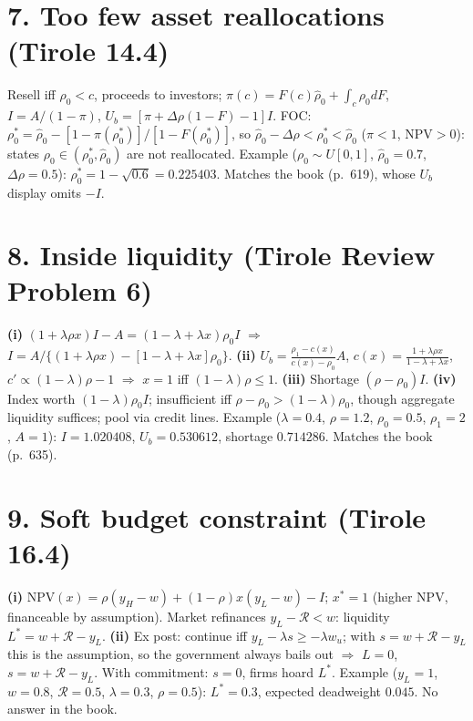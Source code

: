 \documentclass[11pt,a4paper]{article}
\newcommand{\Rc}{\mathcal{R}}
\begin{document}
\section*{7. Too few asset reallocations (Tirole 14.4)}
Resell iff $\rho_0<c$, proceeds to investors; $\pi(c)=F(c)\hat\rho_0+\int_c\rho_0dF$, $I=A/(1-\pi)$, $U_b=[\pi+\Delta\rho(1-F)-1]I$. FOC: $\rho_0^*=\hat\rho_0-[1-\pi(\rho_0^*)]/[1-F(\rho_0^*)]$, so $\hat\rho_0-\Delta\rho<\rho_0^*<\hat\rho_0$ ($\pi<1$, NPV$>0$): states $\rho_0\in(\rho_0^*,\hat\rho_0)$ are not reallocated.
Example ($\rho_0\sim U[0,1]$, $\hat\rho_0=0.7$, $\Delta\rho=0.5$): $\rho_0^*=1-\sqrt{0.6}=0.225403$. Matches the book (p.~619), whose $U_b$ display omits $-I$.

\section*{8. Inside liquidity (Tirole Review Problem 6)}
\textbf{(i)} $(1+\lambda\rho x)I-A=(1-\lambda+\lambda x)\rho_0I$ $\Rightarrow$ $I=A/\{(1+\lambda\rho x)-[1-\lambda+\lambda x]\rho_0\}$.
\textbf{(ii)} $U_b=\frac{\rho_1-c(x)}{c(x)-\rho_0}A$, $c(x)=\frac{1+\lambda\rho x}{1-\lambda+\lambda x}$, $c'\propto(1-\lambda)\rho-1$ $\Rightarrow$ $x=1$ iff $(1-\lambda)\rho\leq1$.
\textbf{(iii)} Shortage $(\rho-\rho_0)I$.
\textbf{(iv)} Index worth $(1-\lambda)\rho_0I$; insufficient iff $\rho-\rho_0>(1-\lambda)\rho_0$, though aggregate liquidity suffices; pool via credit lines.
Example ($\lambda=0.4$, $\rho=1.2$, $\rho_0=0.5$, $\rho_1=2$, $A=1$): $I=1.020408$, $U_b=0.530612$, shortage $0.714286$. Matches the book (p.~635).

\section*{9. Soft budget constraint (Tirole 16.4)}
\textbf{(i)} $\text{NPV}(x)=\rho(y_H-w)+(1-\rho)x(y_L-w)-I$; $x^*=1$ (higher NPV, financeable by assumption). Market refinances $y_L-\Rc<w$: liquidity $L^*=w+\Rc-y_L$.
\textbf{(ii)} Ex post: continue iff $y_L-\lambda s\geq-\lambda w_u$; with $s=w+\Rc-y_L$ this is the assumption, so the government always bails out $\Rightarrow$ $L=0$, $s=w+\Rc-y_L$. With commitment: $s=0$, firms hoard $L^*$.
Example ($y_L=1$, $w=0.8$, $\Rc=0.5$, $\lambda=0.3$, $\rho=0.5$): $L^*=0.3$, expected deadweight $0.045$. No answer in the book.
\end{document}
